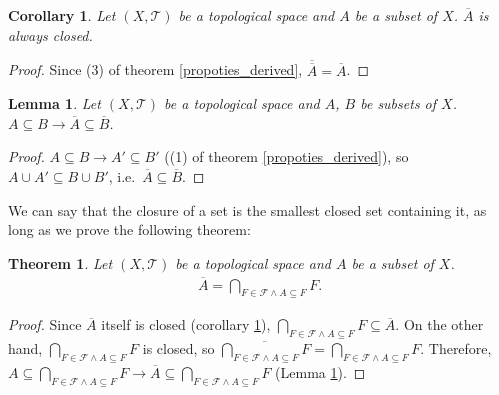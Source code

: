 \documentclass[openany]{book}
\theoremstyle{plain}
\newtheorem{theorem}{Theorem}[section] %
\newtheorem{corollary}{Corollary} %
\newtheorem{lemma}{Lemma} %
\theoremstyle{definition}
\begin{document}
\begin{corollary}\label{closure_closed}
Let $(X,\mathscr T)$ be a topological space and $A$ be a subset of $X$. 
$\overline A$ is always closed.
\end{corollary}
\begin{proof}
Since (3) of theorem \ref{propoties_derived}, $\overline{\overline A} = \overline A$.
\end{proof}

\begin{lemma}\label{subset_closure}
Let $(X,\mathscr T)$ be a topological space and $A$, $B$ be subsets of $X$.
$A\subseteq B \to \overline A\subseteq \overline B$.
\end{lemma}
\begin{proof}
$A\subseteq B \to A'\subseteq B'$ ((1) of theorem \ref{propoties_derived}), so $A\cup A'\subseteq B\cup B'$, i.e.\ $\overline A\subseteq \overline B$.
\end{proof}

We can say that the closure of a set is the smallest closed set containing it, as long as we prove the following theorem:

\begin{theorem}
Let $(X,\mathscr T)$ be a topological space and $A$ be a subset of $X$.
\begin{align*}
	\overline A = \bigcap_{F\in \mathscr F \wedge A\subseteq F} F.
\end{align*}
\end{theorem}
\begin{proof}
Since $\overline A$ itself is closed (corollary \ref{closure_closed}), $\bigcap_{F\in \mathscr F \wedge A\subseteq F} F \subseteq \overline A$. 
On the other hand, $\bigcap_{F\in \mathscr F \wedge A\subseteq F} F$ is closed, so $\overline{\bigcap_{F\in \mathscr F \wedge A\subseteq F} F} = \bigcap_{F\in \mathscr F \wedge A\subseteq F} F$.
Therefore, $A\subseteq \bigcap_{F\in \mathscr F \wedge A\subseteq F} F \to \overline A \subseteq \bigcap_{F\in \mathscr F \wedge A\subseteq F} F$ (Lemma \ref{subset_closure}). 
\end{proof}
\end{document}

